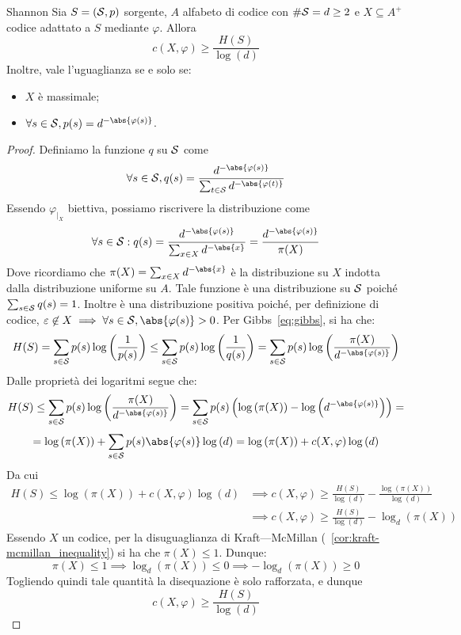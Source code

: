 \begin{theorem}[label=thm:shannon]{Shannon}
  Sia \(S = (\mathcal{S},p)\) sorgente, \(A\) alfabeto di codice con \(\#\mathcal{S} = d \geq 2\) e \(X \subseteq A^+\) codice adattato a \(S\) mediante \(\varphi\).
  Allora
  \[c(X,\varphi) \geq \frac{H(S)}{\log\left(d\right)}\]
  Inoltre, vale l'uguaglianza se e solo se:
  \begin{itemize}
    \item \(X\) è massimale;
    \item \(\forall s\in \SCal, p(s) = d^{-\abs{\varphi(s)}}\).
  \end{itemize}
\end{theorem}
\begin{proof}
  Definiamo la funzione \(q\) su \(\mathcal{S}\) come
  \[\forall s \in \SCal, q(s) = \frac{d^{-\abs{\varphi(s)}}}{\sum_{t \in \SCal} d^{-\abs{\varphi(t)}}}\]
  Essendo \(\varphi_{|_X}\) biettiva, possiamo riscrivere la distribuzione come
  \[\forall s \in \SCal: q(s) = \frac{d^{-\abs{\varphi(s)}}}{\sum_{x\in X} d^{-\abs{x}}} = \frac{d^{-\abs{\varphi(s)}}}{\pi(X)}\]
  Dove ricordiamo che \(\pi(X) = \sum_{x\in X} d^{-\abs{x}}\) è la distribuzione su \(X\) indotta dalla distribuzione uniforme su \(A\).
  Tale funzione è una distribuzione su \(\mathcal{S}\) poiché \(\sum_{s\in\mathcal{S}}q(s) = 1\). Inoltre è una distribuzione positiva poiché, per definizione di codice, \(\varepsilon \not\in X \implies \forall s \in \SCal, \abs{\varphi(s)} > 0\).
  Per Gibbs~\eqref{eq:gibbs}, si ha che:
  \[H(S) = \sum_{s \in \SCal} p(s)\log\left(\frac{1}{p(s)}\right) \leq \sum_{s \in \SCal} p(s) \log\left(\frac{1}{q(s)}\right) = \sum_{s \in \SCal} p(s) \log\left(\frac{\pi(X)}{d^{-\abs{\varphi(s)}}}\right)\]
  Dalle proprietà dei logaritmi segue che:
  \[H(S)\leq \sum_{s \in \SCal} p(s) \log\left(\frac{\pi(X)}{d^{-\abs{\varphi(s)}}}\right)= \sum_{s \in \SCal}p(s)\left(\log\left(\pi(X)\right)-\log\left(d^{-\abs{\varphi(s)}}\right)\right) = \]
  \[=\log\left(\pi(X)\right) + \sum_{s \in \SCal}p(s)\abs{\varphi(s)}\log\left(d\right) = \log\left(\pi(X)\right) + c(X,\varphi)\log\left(d\right)\]
  Da cui
  \begin{align*}
  H(S) \leq \log\left(\pi(X)\right) + c(X,\varphi)\log\left(d\right) &\implies c(X,\varphi) \geq \frac{H(S)}{\log\left(d\right)} - \frac{\log(\pi(X))}{\log(d)} \\
  &\implies c(X,\varphi) \geq \frac{H(S)}{\log\left(d\right)} - \log_{d}(\pi(X))
  \end{align*}
  Essendo \(X\) un codice, per la disuguaglianza di Kraft---McMillan (~\ref{cor:kraft-mcmillan_inequality}) si ha che \(\pi(X) \leq 1\).
  Dunque:
  \[\pi(X)\leq 1 \implies \log_{d}(\pi(X)) \leq 0 \implies -\log_{d}(\pi(X)) \geq 0\]
  Togliendo quindi tale quantità la disequazione è solo rafforzata, e dunque
  \[c(X,\varphi) \geq \frac{H(S)}{\log\left(d\right)}\]


\end{proof}
